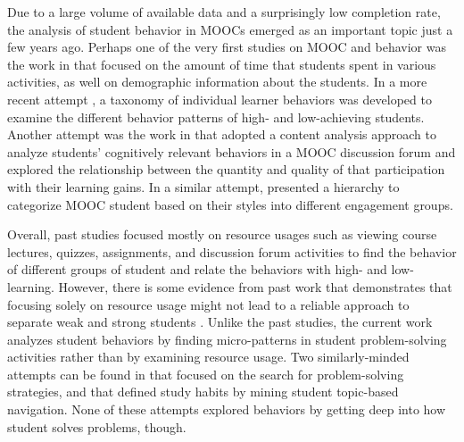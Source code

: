 \documentclass{sigchi}
\begin{document}
Due to a large volume of available data and a surprisingly low completion rate, the analysis of student behavior in MOOCs emerged as an important topic just a few years ago. Perhaps one of the very first studies on MOOC and behavior was the work in \cite{breslow2013studying} that focused on the amount of time that students spent in various activities, as well on demographic information about the students. In a more recent attempt \cite{anderson2014engaging}, a taxonomy of individual learner behaviors was developed to examine the different behavior patterns of high- and low-achieving students. Another attempt was the work in \cite{wang2015investigating} that adopted a content analysis approach to analyze students' cognitively relevant behaviors in a MOOC discussion forum and explored the relationship between the quantity and quality of that participation with their learning gains. In a similar attempt, \cite{sharma2015identifying} presented a hierarchy to categorize MOOC student based on their styles into different engagement groups.

Overall, past studies focused mostly on resource usages such as viewing course lectures, quizzes, assignments, and discussion forum activities to find the behavior of different groups of student and relate the behaviors with high- and low- learning. However, there is some evidence from past work that demonstrates that focusing solely on resource usage might not lead to a reliable approach to separate weak and strong students \cite{champaign2014correlating}. %
Unlike the past studies, the current work analyzes student behaviors by finding micro-patterns in student problem-solving activities rather than by examining resource usage. Two similarly-minded attempts can be found in \cite{toth2014discovering} that focused on the search for problem-solving strategies, and \cite{wen2014identifying} that defined study habits by mining student topic-based navigation. None of these attempts explored behaviors by getting deep into how student solves problems, though. %
\end{document}
